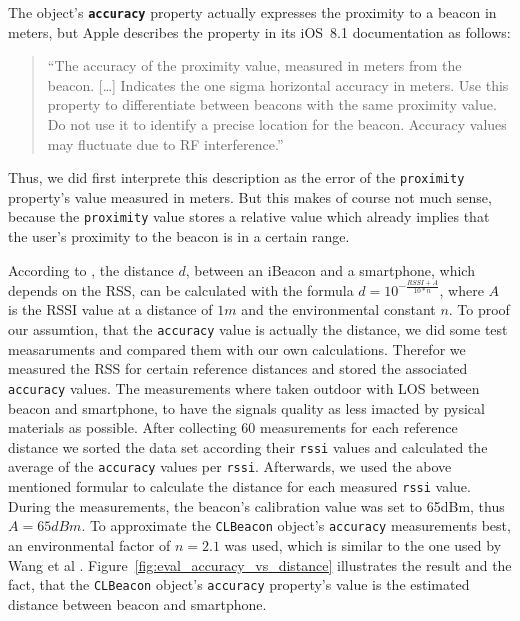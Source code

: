 The object's \textbf{\texttt{accuracy}} property actually expresses the proximity to a beacon in meters, but Apple describes the property in its iOS~8.1 documentation as follows:
\begin{quote}
  ``The accuracy of the proximity value, measured in meters from the beacon.
  [\dots]
  Indicates the one sigma horizontal accuracy in meters. Use this property to differentiate between beacons with the same proximity value. Do not use it to identify a precise location for the beacon. Accuracy values may fluctuate due to RF interference.''\cite{apple:ios_doc_cl}
\end{quote}
Thus, we did first interprete this description as the error of the \texttt{proximity} property's value measured in meters. But this makes of course not much sense, because the \texttt{proximity} value stores a relative value which already implies that the user's proximity to the beacon is in a certain range.\cite{videos}

According to \cite{wang:bt_pos}, the distance $d$, between an iBeacon and a smartphone, which depends on the \acl{RSS}, can be calculated with the formula $d = 10^{-\frac{RSSI + A}{10 * n}}$, where $A$ is the \acs{RSSI} value at a distance of $1m$ and the environmental constant $n$.
To proof our assumtion, that the \texttt{accuracy} value is actually the distance, we did some test measaruments and compared them with our own calculations.
Therefor we measured the \acs{RSS} for certain reference distances and stored the associated \texttt{accuracy} values.
The measurements where taken outdoor with \ac{LOS} between beacon and smartphone, to have the signals quality as less imacted by pysical materials as possible.
After collecting 60 measurements for each reference distance we sorted the data set according their \texttt{rssi} values and calculated the average of the \texttt{accuracy} values per \texttt{rssi}.
Afterwards, we used the above mentioned formular to calculate the distance for each measured \texttt{rssi} value.
During the measurements, the beacon's calibration value was set to 65dBm, thus $A = 65dBm$. To approximate the \texttt{CLBeacon} object's \texttt{accuracy} measurements best, an environmental factor of $n = 2.1$ was used, which is similar to the one used by Wang et al \cite{wang:bt_pos}.
Figure~\ref{fig:eval_accuracy_vs_distance} illustrates the result and the fact, that the \texttt{CLBeacon} object's \texttt{accuracy} property's value is the estimated distance between beacon and smartphone.

